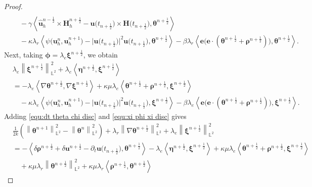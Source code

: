 \documentclass[11pt, reqno]{amsart}
\theoremstyle{definition}
\theoremstyle{remark}
\numberwithin{equation}{section}
\newcommand{\bff}{\boldsymbol}
\newcommand{\bb}{\mathbb}
\newcommand{\norm}[2]{\left\|{#1}\right\|_{#2}}
\newcommand{\inpro}[2]{\left\langle#1,#2\right\rangle}
\begin{document}
\begin{proof}
\begin{align}
	\\
	\nonumber
	&\quad
	-
	\gamma \inpro{\widehat{\bff{u}}_h^{n-\frac{1}{2}} \times \bff{H}_h^{n+\frac{1}{2}} - \bff{u}\big(t_{n+\frac{1}{2}}\big) \times \bff{H}\big(t_{n+\frac{1}{2}}\big)}{\bff{\theta}^{n+\frac{1}{2}}}
	\\
	&\quad 
	-
	\kappa \lambda_r \inpro{\psi\big(\bff{u}_h^n, \bff{u}_h^{n+1}\big) - \big|\bff{u}\big(t_{n+\frac{1}{2}}\big)\big|^2 \bff{u}\big(t_{n+\frac{1}{2}}\big)}{\bff{\theta}^{n+\frac{1}{2}}}
	-
	\beta\lambda_r \inpro{\bff{e}\big(\bff{e}\cdot (\bff{\theta}^{n+\frac12}+\bff{\rho}^{n+\frac12})\big)}{\bff{\theta}^{n+\frac12}}.
\end{align}
Next, taking $\bff{\phi}= \lambda_e \bff{\xi}^{n+\frac{1}{2}}$, we obtain
\begin{align}\label{equ:xi phi xi disc}
	\nonumber
	&\lambda_e \norm{\bff{\xi}^{n+\frac{1}{2}}}{\bb{L}^2}^2
	+
	\lambda_e \inpro{\bff{\eta}^{n+\frac{1}{2}}}{\bff{\xi}^{n+\frac{1}{2}}}
	\\
	&=
	-
	\lambda_e \inpro{\nabla \bff{\theta}^{n+\frac{1}{2}}}{\nabla \bff{\xi}^{n+\frac{1}{2}}}
	+
	\kappa\mu \lambda_e \inpro{\bff{\theta}^{n+\frac{1}{2}}+\bff{\rho}^{n+\frac{1}{2}}}{\bff{\xi}^{n+\frac{1}{2}}}
	\nonumber \\
	&\quad 
	-
	\kappa \lambda_e \inpro{\psi\big(\bff{u}_h^n, \bff{u}_h^{n+1}\big) - \big|\bff{u}\big(t_{n+\frac{1}{2}}\big)\big|^2 \bff{u}\big(t_{n+\frac{1}{2}}\big)}{\bff{\xi}^{n+\frac{1}{2}}}
	-
	\beta\lambda_e \inpro{\bff{e}\big(\bff{e}\cdot (\bff{\theta}^{n+\frac12}+\bff{\rho}^{n+\frac12})\big)}{\bff{\xi}^{n+\frac12}}.
\end{align}
Adding \eqref{equ:dt theta chi disc} and \eqref{equ:xi phi xi disc} gives
\begin{align*}
	&\frac{1}{2k} \left( \norm{\bff{\theta}^{n+1}}{\bb{L}^2}^2 - \norm{\bff{\theta}^n}{\bb{L}^2}^2 \right)
	+
	\lambda_r \norm{\nabla \bff{\theta}^{n+\frac{1}{2}}}{\bb{L}^2}^2
	+
	\lambda_e \norm{\bff{\xi}^{n+\frac{1}{2}}}{\bb{L}^2}^2
	\\
	&=
	-\inpro{\delta \bff{\rho}^{n+\frac{1}{2}} + \delta \bff{u}^{n+\frac{1}{2}} -\partial_t \bff{u}\big(t_{n+\frac{1}{2}}\big)}{\bff{\theta}^{n+\frac{1}{2}}}
	-
	\lambda_e \inpro{\bff{\eta}^{n+\frac{1}{2}}}{\bff{\xi}^{n+\frac{1}{2}}}
	+
	\kappa\mu \lambda_e \inpro{\bff{\theta}^{n+\frac{1}{2}}+\bff{\rho}^{n+\frac{1}{2}}}{\bff{\xi}^{n+\frac{1}{2}}}
	\\
	&\quad
	+
	\kappa\mu \lambda_r \norm{\bff{\theta}^{n+\frac{1}{2}}}{\bb{L}^2}^2
	+
	\kappa\mu\lambda_r \inpro{\bff{\rho}^{n+\frac{1}{2}}}{\bff{\theta}^{n+\frac{1}{2}}}

\end{align*}
\end{proof}
\end{document}
